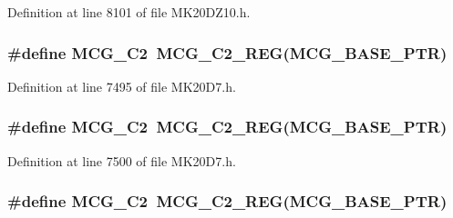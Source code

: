 Definition at line 8101 of file M\+K20\+D\+Z10.\+h.

\subsubsection[{\texorpdfstring{M\+C\+G\+\_\+\+C2}{MCG_C2}}]{\setlength{\rightskip}{0pt plus 5cm}\#define M\+C\+G\+\_\+\+C2~{\bf M\+C\+G\+\_\+\+C2\+\_\+\+R\+EG}({\bf M\+C\+G\+\_\+\+B\+A\+S\+E\+\_\+\+P\+TR})}\hypertarget{group___m_c_g___register___accessor___macros_gabaeaf7dd44e609a83f01b9fec0dec0c3}{}\label{group___m_c_g___register___accessor___macros_gabaeaf7dd44e609a83f01b9fec0dec0c3}


Definition at line 7495 of file M\+K20\+D7.\+h.

\subsubsection[{\texorpdfstring{M\+C\+G\+\_\+\+C2}{MCG_C2}}]{\setlength{\rightskip}{0pt plus 5cm}\#define M\+C\+G\+\_\+\+C2~{\bf M\+C\+G\+\_\+\+C2\+\_\+\+R\+EG}({\bf M\+C\+G\+\_\+\+B\+A\+S\+E\+\_\+\+P\+TR})}\hypertarget{group___m_c_g___register___accessor___macros_gabaeaf7dd44e609a83f01b9fec0dec0c3}{}\label{group___m_c_g___register___accessor___macros_gabaeaf7dd44e609a83f01b9fec0dec0c3}


Definition at line 7500 of file M\+K20\+D7.\+h.

\subsubsection[{\texorpdfstring{M\+C\+G\+\_\+\+C2}{MCG_C2}}]{\setlength{\rightskip}{0pt plus 5cm}\#define M\+C\+G\+\_\+\+C2~{\bf M\+C\+G\+\_\+\+C2\+\_\+\+R\+EG}({\bf M\+C\+G\+\_\+\+B\+A\+S\+E\+\_\+\+P\+TR})}\hypertarget{group___m_c_g___register___accessor___macros_gabaeaf7dd44e609a83f01b9fec0dec0c3}{}\label{group___m_c_g___register___accessor___macros_gabaeaf7dd44e609a83f01b9fec0dec0c3}


